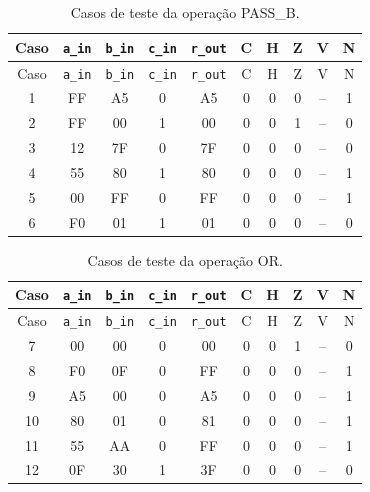 \begin{longtable}{c c c c c c c c c c}
\caption{Casos de teste da operação PASS\_B.}
\label{tab:testes-PASS-B}\\
\hline
Caso & \texttt{a\_in} & \texttt{b\_in} & \texttt{c\_in} & \texttt{r\_out} & C & H & Z & V & N \\ \hline
\endfirsthead
\hline
Caso & \texttt{a\_in} & \texttt{b\_in} & \texttt{c\_in} & \texttt{r\_out} & C & H & Z & V & N \\ \hline
\endhead
1 & FF & A5 & 0 & A5 & 0 & 0 & 0 & {\footnotesize--} & 1 \\
2 & FF & 00 & 1 & 00 & 0 & 0 & 1 & {\footnotesize--} & 0 \\
3 & 12 & 7F & 0 & 7F & 0 & 0 & 0 & {\footnotesize--} & 0 \\
4 & 55 & 80 & 1 & 80 & 0 & 0 & 0 & {\footnotesize--} & 1 \\
5 & 00 & FF & 0 & FF & 0 & 0 & 0 & {\footnotesize--} & 1 \\
6 & F0 & 01 & 1 & 01 & 0 & 0 & 0 & {\footnotesize--} & 0 \\
\hline
\end{longtable}
\vspace{-0.5cm}

\begin{longtable}{c c c c c c c c c c}
\caption{Casos de teste da operação OR.}
\label{tab:testes-OR}\\
\hline
Caso & \texttt{a\_in} & \texttt{b\_in} & \texttt{c\_in} & \texttt{r\_out} & C & H & Z & V & N \\ \hline
\endfirsthead
\hline
Caso & \texttt{a\_in} & \texttt{b\_in} & \texttt{c\_in} & \texttt{r\_out} & C & H & Z & V & N \\ \hline
\endhead
7 & 00 & 00 & 0 & 00 & 0 & 0 & 1 & {\footnotesize--} & 0 \\
8 & F0 & 0F & 0 & FF & 0 & 0 & 0 & {\footnotesize--} & 1 \\
9 & A5 & 00 & 0 & A5 & 0 & 0 & 0 & {\footnotesize--} & 1 \\
10 & 80 & 01 & 0 & 81 & 0 & 0 & 0 & {\footnotesize--} & 1 \\
11 & 55 & AA & 0 & FF & 0 & 0 & 0 & {\footnotesize--} & 1 \\
12 & 0F & 30 & 1 & 3F & 0 & 0 & 0 & {\footnotesize--} & 0 \\
\hline
\end{longtable}
\vspace{-0.5cm}

